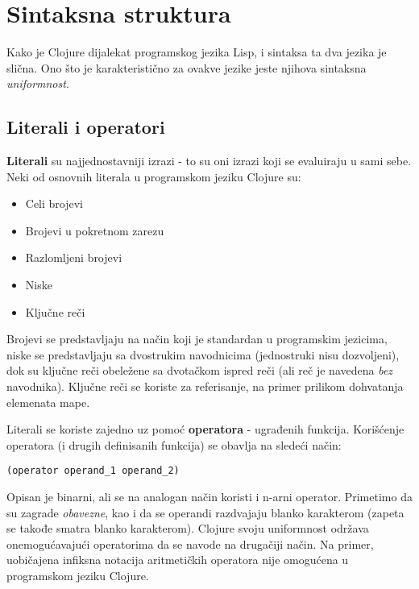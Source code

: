 \section{Sintaksna struktura}
\label{sec:sintaksnastruktura}

Kako je Clojure dijalekat programskog jezika Lisp, i sintaksa ta dva jezika je slična. Ono što je karakteristično za ovakve jezike jeste njihova sintaksna \emph{uniformnost}.

\subsection{Literali i operatori}
\label{subsec:literalioperatori}



\textbf{Literali} su najjednostavniji izrazi - to su oni izrazi koji se evaluiraju u sami sebe. Neki od osnovnih literala u programskom jeziku Clojure su:

\begin{itemize}
    \item Celi brojevi
    \item Brojevi u pokretnom zarezu
    \item Razlomljeni brojevi
    \item Niske
    \item Ključne reči
\end{itemize}

Brojevi se predstavljaju na način koji je standardan u programskim jezicima, niske se predstavljaju sa dvostrukim navodnicima (jednostruki nisu dozvoljeni), dok su ključne reči obeležene sa dvotačkom ispred reči (ali reč je navedena \emph{bez} navodnika).
Ključne reči se koriste za referisanje, na primer prilikom dohvatanja elemenata mape.

Literali se koriste zajedno uz pomoć \textbf{operatora} - ugrađenih funkcija. Korišćenje operatora (i drugih definisanih funkcija) se obavlja na sledeći način:

\begin{verbatim}
(operator operand_1 operand_2)
\end{verbatim}

Opisan je binarni, ali se na analogan način koristi i n-arni operator. Primetimo da su zagrade \emph{obavezne}, kao i da se operandi razdvajaju blanko karakterom (zapeta se takođe smatra blanko karakterom). Clojure svoju uniformnost održava onemogućavajući operatorima da se navode na drugačiji način. Na primer, uobičajena infiksna notacija aritmetičkih operatora nije omogućena u programskom jeziku Clojure. 


